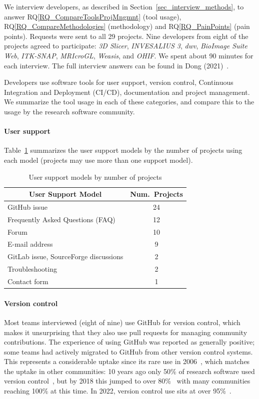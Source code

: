 \documentclass[draft, 12pt, 3p, times]{elsarticle} %
\newcommand{\rqref}[1]{RQ\ref{#1}}
\begin{document}
We interview developers, as described in Section~\ref{sec_interview_methods}, to
answer \rqref{RQ_CompareToolsProjMngmnt} (tool usage),
\rqref{RQ_CompareMethodologies} (methodology) and \rqref{RQ_PainPoints} (pain
points). Requests were sent to all 29 projects.  Nine developers from eight of
the projects agreed to participate: \textit{3D Slicer}, \textit{INVESALIUS 3},
\textit{dwv}, \textit{BioImage Suite Web}, \textit{ITK-SNAP}, \textit{MRIcroGL},
\textit{Weasis}, and \textit{OHIF}. We spent about 90 minutes for each
interview. The full interview answers can be found in Dong
(2021)~\cite{Dong2021}.

Developers use software tools for user support, version control,
Continuous Integration and Deployment (CI/CD), documentation and project
management.  We summarize the tool usage in each of these categories, and
compare this to the usage by the research software community.

\paragraph{User support} Table~\ref{tab_user_support_model} summarizes the user
support models by the number of projects using each model (projects may use
more than one support model).

\begin{table}[ht!]
\caption{\label{tab_user_support_model}User support models by number of projects}
\centering
\begin{tabular}{lc}
\toprule
\multicolumn{1}{c}{User Support Model} & Num.\ Projects \\
\midrule
GitHub issue & 24 \\
Frequently Asked Questions (FAQ) & 12 \\
Forum & 10 \\
E-mail address & 9 \\
GitLab issue, SourceForge discussions & 2 \\
Troubleshooting & 2 \\
Contact form & 1 \\ 
\bottomrule
\end{tabular}
\end{table}

\paragraph{Version control} Most teams interviewed (eight of nine) use GitHub
for version control, which makes it unsurprising that they also use pull
requests for managing community contributions. The experience of using GitHub
was reported as generally positive; some teams had actively migrated to GitHub
from other version control systems.  This represents a considerable uptake since
its rare use in 2006~\cite{Wilson2006}, which matches the uptake in other
communities: 10 years ago only 50\% of research software used version
control~\cite{Nguyen-HoanEtAl2010}, but by 2018 this jumped to over
80\%~\cite{AlNoamanyAndBorghi2018} with many communities~\cite{Smith2018}
reaching 100\% at this time. In 2022, version control use sits at over
95\%~\cite{CarverEtAl2022}.
\end{document}
